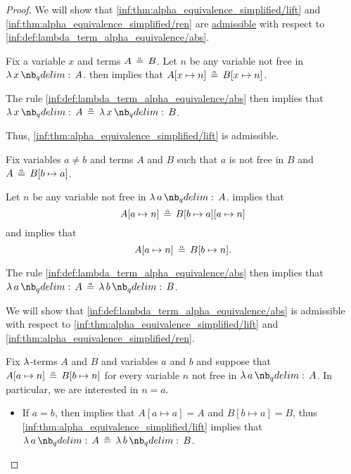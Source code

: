 \begin{proof}
  \SufficiencySubProof We will show that \ref{inf:thm:alpha_equivalence_simplified/lift} and \ref{inf:thm:alpha_equivalence_simplified/ren} are \hyperref[con:inference_rule_admissibility]{admissible} with respect to \ref{inf:def:lambda_term_alpha_equivalence/abs}.

   Fix a variable \( x \) and terms \( A \aequiv B \). Let \( n \) be any variable not free in \( \qabs x A \).  then implies that \( A[x \mapsto n] \aequiv B[x \mapsto n] \).

  The rule \ref{inf:def:lambda_term_alpha_equivalence/abs} then implies that \( \qabs x A \aequiv \qabs x B \).

  Thus, \ref{inf:thm:alpha_equivalence_simplified/lift} is admissible.

   Fix variables \( a \neq b \) and terms \( A \) and \( B \) such that \( a \) is not free in \( B \) and \( A \aequiv B[b \mapsto a] \).

  Let \( n \) be any variable not free in \( \qabs a A \).  implies that
  \begin{equation*}
    A[a \mapsto n] \aequiv B[b \mapsto a][a \mapsto n]
  \end{equation*}
  and  implies that
  \begin{equation*}
    A[a \mapsto n] \aequiv B[b \mapsto n].
  \end{equation*}

  The rule \ref{inf:def:lambda_term_alpha_equivalence/abs} then implies that \( \qabs a A \aequiv \qabs b B \).

  \NecessitySubProof We will show that \ref{inf:def:lambda_term_alpha_equivalence/abs} is admissible with respect to \ref{inf:thm:alpha_equivalence_simplified/lift} and \ref{inf:thm:alpha_equivalence_simplified/ren}.

  Fix \( \mathrm{\lambda} \)-terms \( A \) and \( B \) and variables \( a \) and \( b \) and suppose that \( A[a \mapsto n] \aequiv B[b \mapsto n] \) for every variable \( n \) not free in \( \qabs a A \). In particular, we are interested in \( n = a \).

  \begin{itemize}
    \item If \( a = b \), then  implies that \( A[a \mapsto a] = A \) and \( B[b \mapsto a] = B \), thus \ref{inf:thm:alpha_equivalence_simplified/lift} implies that \( \qabs a A \aequiv \qabs b B \).


\end{itemize}
\end{proof}
